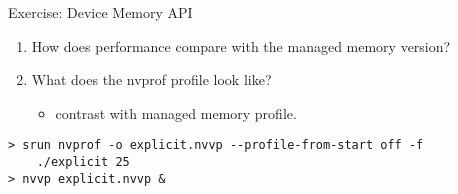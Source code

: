 \documentclass[aspectratio=43]{beamer}
\begin{document}
\begin{frame}[fragile]{Exercise: Device Memory API}
    \begin{enumerate}
        \item How does performance compare with the managed memory version?
        \item What does the nvprof profile look like?
        \begin{itemize}
            \item contrast with managed memory profile.
        \end{itemize}
    \end{enumerate}

\begin{terminal}{}
\begin{lstlisting}[style=terminal]
> srun nvprof -o explicit.nvvp --profile-from-start off -f
    ./explicit 25
> nvvp explicit.nvvp &
\end{lstlisting}
\end{terminal}

\end{frame}
\end{document}
